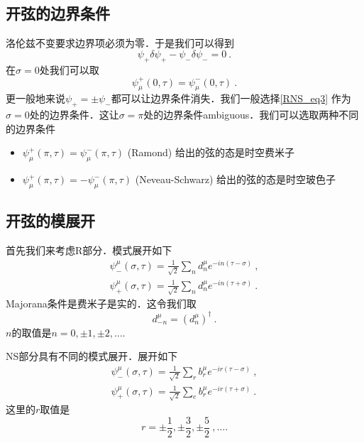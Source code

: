 \subsection{开弦的边界条件}
洛伦兹不变要求边界项必须为零．于是我们可以得到
\begin{equation}
\psi_+ \delta \psi_+ - \psi_- \delta \psi_- = 0~.
\end{equation}
在$\sigma = 0$处我们可以取
\begin{equation}\label{RNS_eq3}
\psi^+_\mu(0,\tau) = \psi^-_{\mu} (0,\tau) ~.
\end{equation}
更一般地来说$\psi_+ = \pm \psi_-$都可以让边界条件消失．我们一般选择\autoref{RNS_eq3} 作为$\sigma = 0$处的边界条件．这让$\sigma = \pi$处的边界条件ambiguous．我们可以选取两种不同的边界条件
\begin{itemize}
\item $\psi^+_\mu(\pi,\tau) = \psi^-_\mu(\pi,\tau)$ (Ramond)
给出的弦的态是时空费米子
\item $\psi^+_\mu(\pi,\tau) = - \psi^-_\mu(\pi,\tau)$ (Neveau-Schwarz) 给出的弦的态是时空玻色子
\end{itemize}

\subsection{开弦的模展开}
首先我们来考虑R部分．模式展开如下
\begin{equation}
\begin{aligned}
\psi^\mu_-(\sigma,\tau) = \frac{1}{\sqrt{2}} \sum_n d^\mu_n e^{- i n (\tau-\sigma)}~, \\
\psi^\mu_+(\sigma, \tau ) = \frac{1}{\sqrt{2}} \sum_n d^\mu_n e^{- i n (\tau+\sigma)}~.
\end{aligned}
\end{equation}
Majorana条件是费米子是实的．这令我们取
\begin{equation}
d^\mu_{-n} = (d^\mu_n)^\dagger~.
\end{equation}
$n$的取值是$n=0,\pm 1,\pm 2,\ldots$.

NS部分具有不同的模式展开．展开如下
\begin{equation}
\begin{aligned}
\psi^\mu_-(\sigma,\tau) = \frac{1}{\sqrt{2}} \sum_r b^\mu_r e^{- i r(\tau-\sigma)}~, \\
\psi^\mu_+(\sigma,\tau) = \frac{1}{\sqrt{2}} \sum_e b^\mu_r e^{- i r (\tau+\sigma)}~.
\end{aligned}
\end{equation}
这里的$r$取值是
\begin{equation}
r = \pm \frac{1}{2}, \pm \frac{3}{2}, \pm \frac{5}{2}~, \ldots.
\end{equation}

